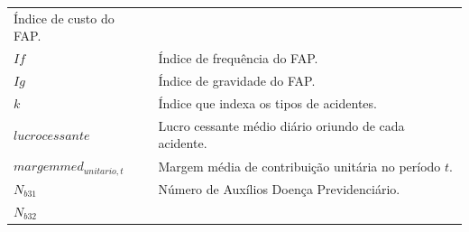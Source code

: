 \documentclass[]{article}
\begin{document}
\begin{longtable}[]{@{}ll@{}}
\begin{minipage}[t]{0.87\columnwidth}
Índice de custo do FAP.\strut
\end{minipage}\tabularnewline
\begin{minipage}[t]{0.07\columnwidth}\raggedright\strut
\(If\)\strut
\end{minipage} & \begin{minipage}[t]{0.87\columnwidth}\raggedright\strut
Índice de frequência do FAP.\strut
\end{minipage}\tabularnewline
\begin{minipage}[t]{0.07\columnwidth}\raggedright\strut
\(Ig\)\strut
\end{minipage} & \begin{minipage}[t]{0.87\columnwidth}\raggedright\strut
Índice de gravidade do FAP.\strut
\end{minipage}\tabularnewline
\begin{minipage}[t]{0.07\columnwidth}\raggedright\strut
\(k\)\strut
\end{minipage} & \begin{minipage}[t]{0.87\columnwidth}\raggedright\strut
Índice que indexa os tipos de acidentes.\strut
\end{minipage}\tabularnewline
\begin{minipage}[t]{0.07\columnwidth}\raggedright\strut
\(lucrocessante\)\strut
\end{minipage} & \begin{minipage}[t]{0.87\columnwidth}\raggedright\strut
Lucro cessante médio diário oriundo de cada acidente.\strut
\end{minipage}\tabularnewline
\begin{minipage}[t]{0.07\columnwidth}\raggedright\strut
\(margemmed_{unitario, t}\)\strut
\end{minipage} & \begin{minipage}[t]{0.87\columnwidth}\raggedright\strut
Margem média de contribuição unitária no período \(t\).\strut
\end{minipage}\tabularnewline
\begin{minipage}[t]{0.07\columnwidth}\raggedright\strut
\(N_{b31}\)\strut
\end{minipage} & \begin{minipage}[t]{0.87\columnwidth}\raggedright\strut
Número de Auxílios Doença Previdenciário.\strut
\end{minipage}\tabularnewline
\begin{minipage}[t]{0.07\columnwidth}\raggedright\strut
\(N_{b32}\)\strut
\end{minipage} & \begin{minipage}[t]{0.87\columnwidth}\raggedright\strut

\end{minipage}
\end{longtable}
\end{document}
